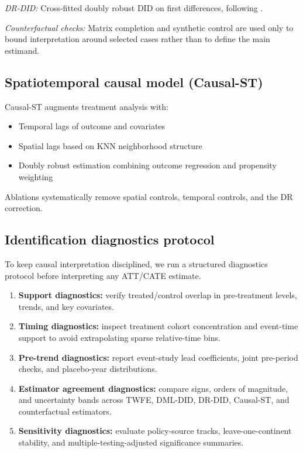 \documentclass[11pt,a4paper]{article}
\begin{document}
\textit{DR-DID:} Cross-fitted doubly robust DID on first differences, following \citet{santanna2020dr}.

\textit{Counterfactual checks:} Matrix completion \citep{athey2021matrix} and synthetic control \citep{abadie2010synthetic} are used only to bound interpretation around selected cases rather than to define the main estimand.

\subsection{Spatiotemporal causal model (Causal-ST)}
Causal-ST augments treatment analysis with:
\begin{itemize}
  \item Temporal lags of outcome and covariates
  \item Spatial lags based on KNN neighborhood structure
  \item Doubly robust estimation combining outcome regression and propensity weighting
\end{itemize}
Ablations systematically remove spatial controls, temporal controls, and the DR correction.

\subsection{Identification diagnostics protocol}
To keep causal interpretation disciplined, we run a structured diagnostics protocol before interpreting any ATT/CATE estimate.
\begin{enumerate}[label=\arabic*.]
  \item \textbf{Support diagnostics:} verify treated/control overlap in pre-treatment levels, trends, and key covariates.
  \item \textbf{Timing diagnostics:} inspect treatment cohort concentration and event-time support to avoid extrapolating sparse relative-time bins.
  \item \textbf{Pre-trend diagnostics:} report event-study lead coefficients, joint pre-period checks, and placebo-year distributions.
  \item \textbf{Estimator agreement diagnostics:} compare signs, orders of magnitude, and uncertainty bands across TWFE, DML-DID, DR-DID, Causal-ST, and counterfactual estimators.
  \item \textbf{Sensitivity diagnostics:} evaluate policy-source tracks, leave-one-continent stability, and multiple-testing-adjusted significance summaries.
\end{enumerate}
\end{document}
